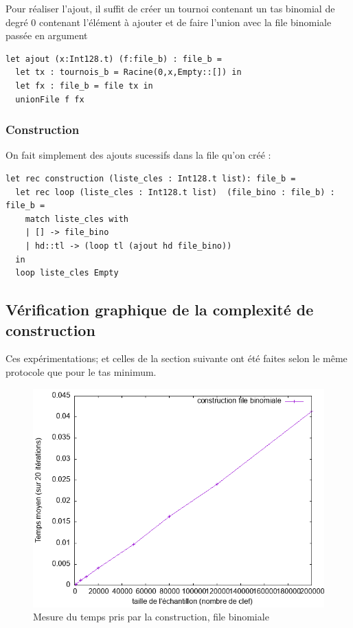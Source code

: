 \documentclass[12pt,a4paper]{article}
\begin{document}
Pour réaliser l'ajout, il suffit de créer un tournoi contenant un tas binomial de degré 0 contenant l'élément à ajouter et de faire l'union avec la file binomiale passée en argument 

\bigskip \begin{lstlisting}
let ajout (x:Int128.t) (f:file_b) : file_b =
  let tx : tournois_b = Racine(0,x,Empty::[]) in
  let fx : file_b = file tx in
  unionFile f fx 
\end{lstlisting} \bigskip

\subsubsection{Construction}
On fait simplement des ajouts sucessifs dans la file qu'on créé :
\bigskip \begin{lstlisting}
let rec construction (liste_cles : Int128.t list): file_b =
  let rec loop (liste_cles : Int128.t list)  (file_bino : file_b) : file_b = 
    match liste_cles with 
    | [] -> file_bino
    | hd::tl -> (loop tl (ajout hd file_bino))
  in
  loop liste_cles Empty
\end{lstlisting} \bigskip


\subsection{Vérification graphique de la complexité de construction}
Ces expérimentations; et celles de la section suivante ont été faites selon le même protocole que pour le tas minimum. 

\begin{figure}[hbtp]
\centering
\includegraphics[scale=0.4]{../Images/svg courbes pour rapport/cplxt_binomiale.png}
\caption{Mesure du temps pris par la construction, file binomiale}
\label{fig7}
\end{figure}
\end{document}

